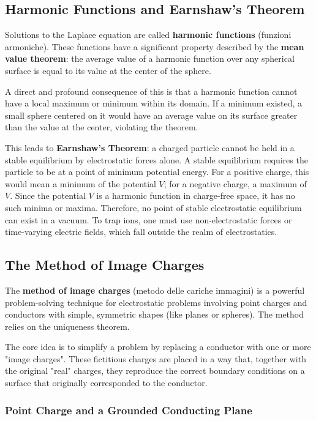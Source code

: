 \subsection{Harmonic Functions and Earnshaw's Theorem}

Solutions to the Laplace equation are called \textbf{harmonic functions} (funzioni armoniche). These functions have a significant property described by the \textbf{mean value theorem}: the average value of a harmonic function over any spherical surface is equal to its value at the center of the sphere.

A direct and profound consequence of this is that a harmonic function cannot have a local maximum or minimum within its domain. If a minimum existed, a small sphere centered on it would have an average value on its surface greater than the value at the center, violating the theorem.

This leads to \textbf{Earnshaw's Theorem}: a charged particle cannot be held in a stable equilibrium by electrostatic forces alone. A stable equilibrium requires the particle to be at a point of minimum potential energy. For a positive charge, this would mean a minimum of the potential $V$; for a negative charge, a maximum of $V$. Since the potential $V$ is a harmonic function in charge-free space, it has no such minima or maxima. Therefore, no point of stable electrostatic equilibrium can exist in a vacuum. To trap ions, one must use non-electrostatic forces or time-varying electric fields, which fall outside the realm of electrostatics.

\subsection{The Method of Image Charges}

The \textbf{method of image charges} (metodo delle cariche immagini) is a powerful problem-solving technique for electrostatic problems involving point charges and conductors with simple, symmetric shapes (like planes or spheres). The method relies on the uniqueness theorem.

The core idea is to simplify a problem by replacing a conductor with one or more "image charges". These fictitious charges are placed in a way that, together with the original "real" charges, they reproduce the correct boundary conditions on a surface that originally corresponded to the conductor.

\subsubsection{Point Charge and a Grounded Conducting Plane}

